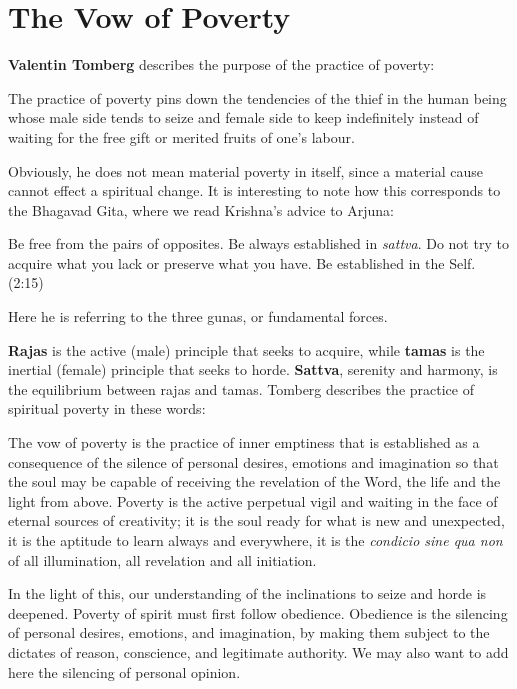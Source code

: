 \section{The Vow of Poverty}

\textbf{Valentin Tomberg} describes the purpose of the practice of poverty:

\begin{quotex}
The practice of poverty pins down the tendencies of the thief in the human being whose male side tends to seize and female side to keep indefinitely instead of waiting for the free gift or merited fruits of one's labour.
\end{quotex}

Obviously, he does not mean material poverty in itself, since a material cause cannot effect a spiritual change. It is interesting to note how this corresponds to the Bhagavad Gita, where we read Krishna's advice to Arjuna:

\begin{quotex}
Be free from the pairs of opposites. Be always established in \emph{sattva}. Do not try to acquire what you lack or preserve what you have. Be established in the Self. (2:15)
\end{quotex}


Here he is referring to the three gunas, or fundamental forces.

\textbf{Rajas} is the active (male) principle that seeks to acquire, while \textbf{tamas} is the inertial (female) principle that seeks to horde. \textbf{Sattva}, serenity and harmony, is the equilibrium between rajas and tamas. Tomberg describes the practice of spiritual poverty in these words:

\begin{quotex}
The vow of poverty is the practice of inner emptiness that is established as a consequence of the silence of personal desires, emotions and imagination so that the soul may be capable of receiving the revelation of the Word, the life and the light from above. Poverty is the active perpetual vigil and waiting in the face of eternal sources of creativity; it is the soul ready for what is new and unexpected, it is the aptitude to learn always and everywhere, it is the \emph{condicio sine qua non} of all illumination, all revelation and all initiation.
\end{quotex}


In the light of this, our understanding of the inclinations to seize and horde is deepened. Poverty of spirit must first follow obedience. Obedience is the silencing of personal desires, emotions, and imagination, by making them subject to the dictates of reason, conscience, and legitimate authority. We may also want to add here the silencing of personal opinion.

